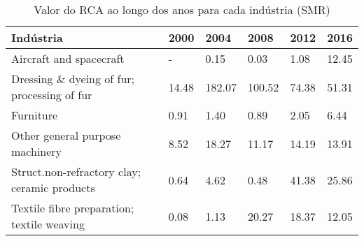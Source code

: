 \begin{table}
\centering
\caption{Valor do RCA ao longo dos anos para cada indústria (SMR)}
\label{tab:ex3-tempo-SMR}
\begin{tabular}{p{6cm}p{1.5cm}p{1.5cm}p{1.5cm}p{1.5cm}p{1.5cm}}
\toprule
                                   Indústria &  2000 &   2004 &   2008 &  2012 &  2016 \\
\midrule
                     Aircraft and spacecraft &     - &   0.15 &   0.03 &  1.08 & 12.45 \\
 Dressing \& dyeing of fur; processing of fur & 14.48 & 182.07 & 100.52 & 74.38 & 51.31 \\
                                   Furniture &  0.91 &   1.40 &   0.89 &  2.05 &  6.44 \\
             Other general purpose machinery &  8.52 &  18.27 &  11.17 & 14.19 & 13.91 \\
Struct.non-refractory clay; ceramic products &  0.64 &   4.62 &   0.48 & 41.38 & 25.86 \\
  Textile fibre preparation; textile weaving &  0.08 &   1.13 &  20.27 & 18.37 & 12.05 \\
\bottomrule
\end{tabular}
\end{table}
